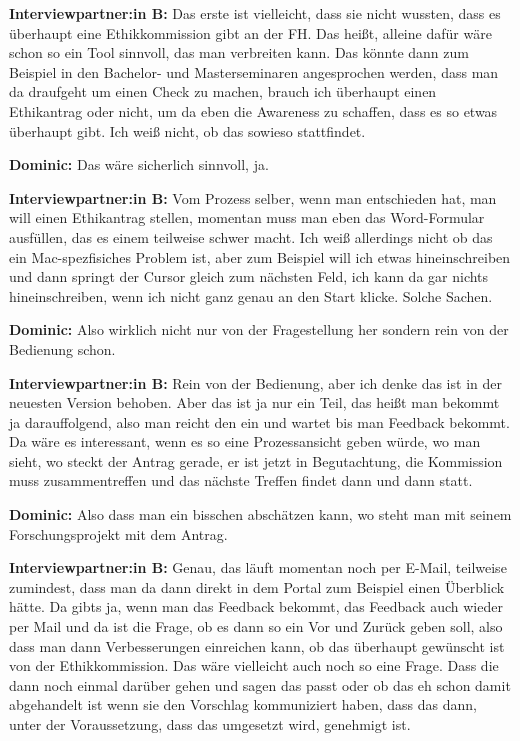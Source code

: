 \documentclass[a4paper,12pt,twoside]{scrreprt}
\begin{document}
\textbf{Interviewpartner:in B:} Das erste ist vielleicht, dass sie nicht wussten, dass es überhaupt eine Ethikkommission gibt an der FH. Das heißt, alleine dafür wäre schon so ein Tool sinnvoll, das man verbreiten kann. Das könnte dann zum Beispiel in den Bachelor- und Masterseminaren angesprochen werden, dass man da draufgeht um einen Check zu machen, brauch ich überhaupt einen Ethikantrag oder nicht, um da eben die Awareness zu schaffen, dass es so etwas überhaupt gibt. Ich weiß nicht, ob das sowieso stattfindet.

\textbf{Dominic:} Das wäre sicherlich sinnvoll, ja.

\textbf{Interviewpartner:in B:} Vom Prozess selber, wenn man entschieden hat, man will einen Ethikantrag stellen, momentan muss man eben das Word-Formular ausfüllen, das es einem teilweise schwer macht. Ich weiß allerdings nicht ob das ein Mac-spezfisiches Problem ist, aber zum Beispiel will ich etwas hineinschreiben und dann springt der Cursor gleich zum nächsten Feld, ich kann da gar nichts hineinschreiben, wenn ich nicht ganz genau an den Start klicke. Solche Sachen.

\textbf{Dominic:} Also wirklich nicht nur von der Fragestellung her sondern rein von der Bedienung schon.

\textbf{Interviewpartner:in B:} Rein von der Bedienung, aber ich denke das ist in der neuesten Version behoben. Aber das ist ja nur ein Teil, das heißt man bekommt ja darauffolgend, also man reicht den ein und wartet bis man Feedback bekommt. Da wäre es interessant, wenn es so eine Prozessansicht geben würde, wo man sieht, wo steckt der Antrag gerade, er ist jetzt in Begutachtung, die Kommission muss zusammentreffen und das nächste Treffen findet dann und dann statt.

\textbf{Dominic:} Also dass man ein bisschen abschätzen kann, wo steht man mit seinem Forschungsprojekt mit dem Antrag.

\textbf{Interviewpartner:in B:} Genau, das läuft momentan noch per E-Mail, teilweise zumindest, dass man da dann direkt in dem Portal zum Beispiel einen Überblick hätte. Da gibts ja, wenn man das Feedback bekommt, das Feedback auch wieder per Mail und da ist die Frage, ob es dann so ein Vor und Zurück geben soll, also dass man dann Verbesserungen einreichen kann, ob das überhaupt gewünscht ist von der Ethikkommission. Das wäre vielleicht auch noch so eine Frage. Dass die dann noch einmal darüber gehen und sagen das passt oder ob das eh schon damit abgehandelt ist wenn sie den Vorschlag kommuniziert haben, dass das dann, unter der Voraussetzung, dass das umgesetzt wird, genehmigt ist.
\end{document}
